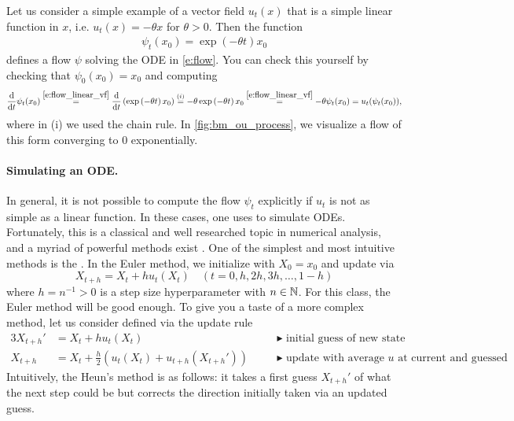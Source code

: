 \begin{examplebox}
Let us consider a simple example of a vector field $u_t(x)$ that is a simple linear function in $x$, i.e. $u_t(x)=-\theta x$ for $\theta>0$. Then the function
\begin{align}
    \label{e:flow_linear_vf}
    \psi_t(x_0) =  \exp\left(-\theta t\right)x_0
\end{align}
defines a flow $\psi$ solving the ODE in \cref{e:flow}. You can check this yourself by checking that $\psi_0(x_0)=x_0$ and computing
\begin{align*}
    \frac{\dd}{\dd t}\psi_t(x_0) \overset{\eqref{e:flow_linear_vf}}{=}\frac{\dd}{\dd t}\left(\exp\left(-\theta t\right)x_0\right)
    \overset{(i)}{=}-\theta\exp\left(-\theta t\right)x_0\overset{\eqref{e:flow_linear_vf}}{=}-\theta\psi_t(x_0)=u_t(\psi_t(x_0)),
\end{align*}
where in (i) we used the chain rule. In \cref{fig:bm_ou_process}, we visualize a flow of this form converging to $0$ exponentially.
\end{examplebox}

\paragraph{Simulating an ODE.}
In general, it is not possible to compute the flow $\psi_t$ explicitly if $u_t$ is not as simple as a linear function. In these cases, one uses  to simulate ODEs. Fortunately, this is a classical and well researched topic in numerical analysis, and a myriad of powerful methods exist \citep{iserles2009first}. One of the simplest and most intuitive methods is the . In the Euler method, we initialize with $X_0=x_0$ and update via
\begin{equation}
\label{e:euler_method}
X_{t+h} = X_t + h u_t(X_t)\quad (t=0,h,2h,3h,\dots,1-h)
\end{equation}
where $h=n^{-1}>0$ is a step size hyperparameter with $n \in \mathbb N$. For this class, the Euler method will be good enough. To give you a taste of a more complex method, let us consider  defined via the update rule
\begin{alignat*}{3}
    X_{t+h}'&=X_t+hu_t(X_t)\quad &&\blacktriangleright\,\, \text{initial guess of new state}\\
    X_{t+h} &= X_{t} + \frac{h}{2}(u_t(X_t)+u_{t+h}(X_{t+h}'))\quad &&\blacktriangleright\,\,\text{update with average $u$ at current and guessed state}
\end{alignat*}
Intuitively, the Heun's method is as follows: it takes a first guess $X_{t+h}'$ of what the next step could be but corrects the direction initially taken via an updated guess.

